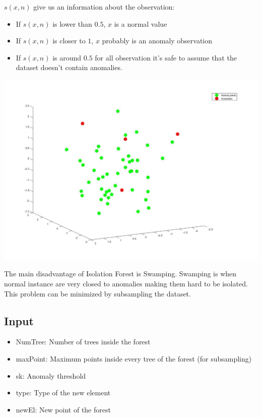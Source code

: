 \documentclass[journal]{IEEEtran}
\begin{document}
\(s(x,n)\) give us an information about the observation:
\begin{itemize}
\item If \(s(x,n)\) is lower than \(0.5\), \(x\) is a normal value
\item If \(s(x,n)\) is closer to \(1\), \(x\) probably is an anomaly observation
\item If \(s(x,n)\) is around \(0.5\) for all observation it's safe to assume that the dataset doesn't contain anomalies.
\end{itemize}

\begin{center}
\includegraphics[width=\columnwidth]{grafico.jpg}
\end{center}

The main disadvantage of Isolation Forest is Swamping. Swamping is when normal instance are very closed to anomalies making them hard to be isolated. This problem can be minimized by subsampling the dataset.

\subsection{Input}
\begin{itemize}
\item NumTree: Number of trees inside the forest 
\item maxPoint: Maximum points inside every tree of the forest (for subsampling)
\item sk: Anomaly threshold 
\item type: Type of the new element 
\item newEl: New point of the forest 
\end{itemize}
\end{document}

